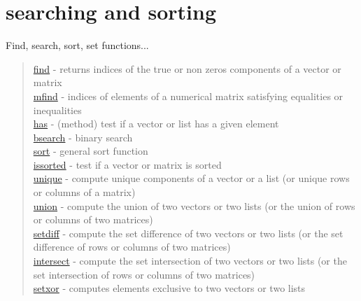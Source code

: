 \chapter*{searching and sorting}
\hypertarget{searchandsort}{}
Find, search, sort, set functions...

\begin{quote}
\noindent
\hyperlink{find}{find} - returns indices of the true or non zeros
components of a vector or matrix \\
\hyperlink{mfind}{mfind} - indices of elements of a numerical matrix satisfying equalities or inequalities\\
\hyperlink{has}{has} - (method) test if a vector or list has a given element\\
\hyperlink{bsearch}{bsearch} - binary search \\
\hyperlink{sort}{sort} - general sort function \\
\hyperlink{issorted}{issorted} - test if a vector or matrix is sorted \\
\hyperlink{unique}{unique} - compute unique components of a vector or a list (or unique rows or columns of a matrix) \\
\hyperlink{union}{union} - compute the union of two vectors or two lists (or the union of rows or columns of two matrices) \\
\hyperlink{setdiff}{setdiff} - compute the set difference of two vectors or two lists (or the set difference of rows or columns of two matrices) \\
\hyperlink{intersect}{intersect} - compute the set intersection of two vectors or two lists  (or the set intersection of rows or columns of two matrices)\\
\hyperlink{setxor}{setxor} - computes elements exclusive to two vectors or two lists\\
\end{quote}

 
 
 
 
 

 
 
 
  
 
